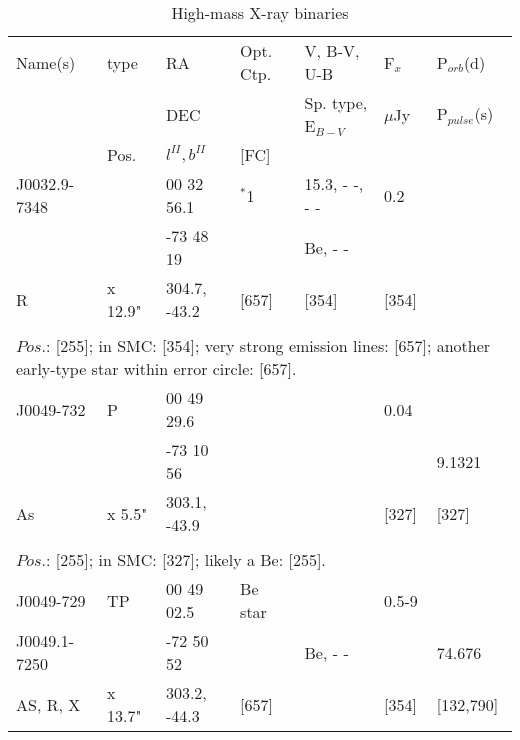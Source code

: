 \documentclass{aa}
\begin{document}
   
\begin{table*}[h]
\caption{High-mass X-ray binaries}
\begin{tabular}{p{2.5cm}p{1cm}p{1.8cm}p{2.3cm}p{3.3cm}p{2.0cm}p{2.2cm}}
\hline
\noalign{\smallskip}
Name(s)      & type  & RA                         &  Opt. Ctp.   & V, B-V, U-B                   &   F$_{x}$            & P$_{orb}$(d)    \\
                      &            & DEC                      &                       &  Sp. type, E$_{B-V}$  &    $\mu$Jy        & P$_{pulse}$(s) \\
                      & Pos.   & $l^{II}, b^{II}$       &  [FC]             &                                          &                             &                             \\
\noalign{\smallskip} 
\hline
\noalign{\smallskip}
J0032.9-7348  &                  & 00 32 56.1       & $^*$1                       & 15.3, - -, - -   &   0.2         &  \\
                           &                  & -73 48 19        &                                   & Be, - -           &                   &  \\
R                        &   x 12.9"  & 304.7, -43.2    &   [657]                       & [354]             &  [354]       &  \\
\\
\multicolumn{7}{p{17.5cm}}{$Pos$.: [255]; in SMC: [354]; very strong emission lines: [657]; another 
early-type star within error circle: [657].}\\

\noalign{\smallskip}
\hline
\noalign{\smallskip}
J0049-732   &   P             & 00 49 29.6      &           &      &   0.04          &                \\
                      &                   & -73 10 56        &           &      &                    & 9.1321  \\           
As                 &    x 5.5"    & 303.1, -43.9    &           &      &   [327]        & [327]     \\          

\\
\multicolumn{7}{p{17.5cm}}{$Pos$.: [255]; in SMC: [327]; likely a Be: [255].}\\

\noalign{\smallskip}
\hline
\noalign{\smallskip}
J0049-729        &     TP       &    00 49 02.5    &   Be  star      &                     &  0.5-9               &                  \\                
J0049.1-7250  &                  &    -72 50 52      &                        & Be, - -         &                             &    74.676  \\
 AS, R, X          &  x 13.7"   & 303.2, -44.3     &    [657]           &                     &   [354]                &   [132,790]       \\
  

\end{tabular}
\end{table*}
\end{document}
